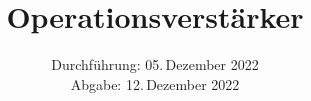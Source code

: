 

\subject{V51}
\title{Operationsverstärker}
\date{%
  Durchführung: 05.\,Dezember 2022
  \\
  Abgabe: 12.\,Dezember 2022
}



\maketitle
\thispagestyle{empty}
\tableofcontents
\newpage







\newpage
\printbibliography{}


